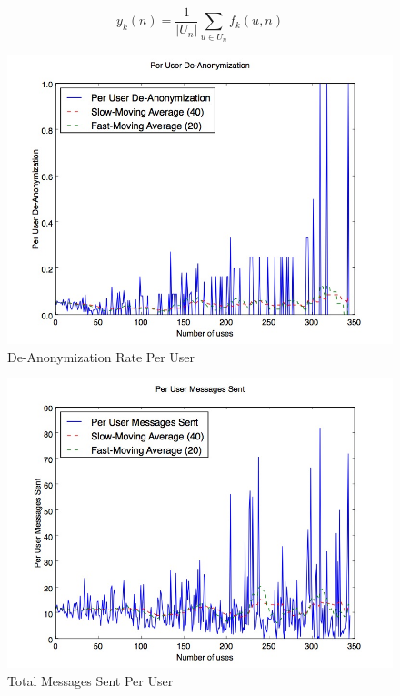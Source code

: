 \begin{equation}
\label{eq:PerUserFormula}
y_k(n) = \frac{1}{|U_n|}\sum_{u \in U_n}{f_k(u, n)}
\end{equation}

\begin{figure}[H]
\centering
\includegraphics[trim= 0mm 0mm 0mm 0mm, clip, scale=0.5]{./Figures/PerUserDe-Anonymization.jpg}
\caption{De-Anonymization Rate Per User}
\label{fig:PerUserFBConnect}
\end{figure}

\begin{figure}[H]
\centering
\includegraphics[trim= 0mm 0mm 0mm 0mm, clip, scale=0.5]{./Figures/PerUserMessagesSent.jpg}
\caption{Total Messages Sent Per User}
\label{fig:PerUserMessagesSent}
\end{figure}

